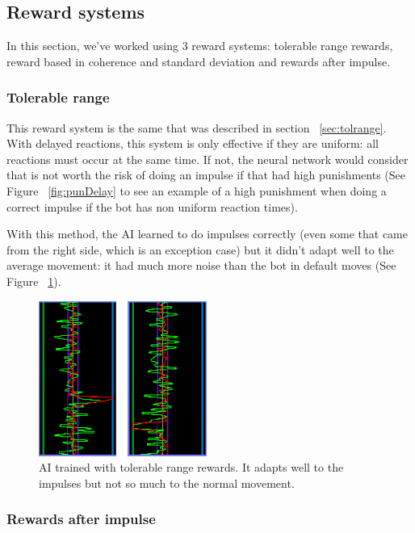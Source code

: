 \subsection{Reward systems}
\label{sec:rtrewsys}

In this section, we've worked using 3 reward systems: tolerable range rewards, reward based in coherence and standard deviation and rewards after impulse.

\subsubsection{Tolerable range}

This reward system is the same that was described in section ~\ref{sec:tolrange}. With delayed reactions, this system is only effective if they are uniform: all reactions must occur at the same time. If not, the neural network would consider that is not worth the risk of doing an impulse if that had high punishments (See Figure ~\ref{fig:punDelay} to see an example of a high punishment when doing a correct impulse if the bot has non uniform reaction times).

With this method, the AI learned to do impulses correctly (even some that came from the right side, which is an exception case) but it didn't adapt well to the average movement: it had much more noise than the bot in default moves (See Figure ~\ref{fig:timeTR}).

\begin{figure}[h]
  \centering
		\includegraphics[width=.6\textwidth]{img/timeTR.png}
  \caption{AI trained with tolerable range rewards. It adapts well to the impulses but not so much to the normal movement.}
  \label{fig:timeTR}
\end{figure}

\subsubsection{Rewards after impulse}

